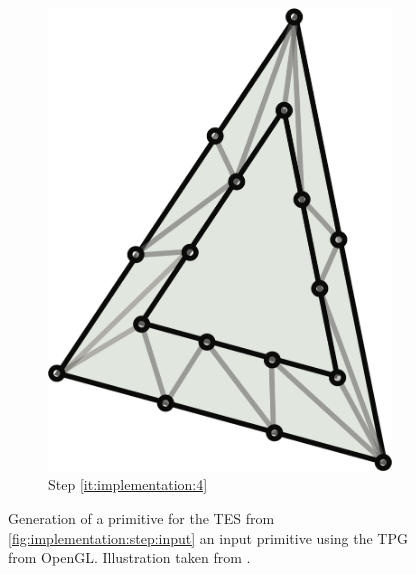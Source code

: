 \begin{figure}
\begin{subfigure}[b]{0.18\columnwidth}
		\includegraphics[width=\textwidth]{content/img/implementation/tessellation_4.png}
		\caption{Step \ref{it:implementation:4}}
		\label{fig:implementation:step:4}
	\end{subfigure}		
	\caption{Generation of a primitive for the TES  from  \ref{fig:implementation:step:input} an input primitive using the TPG from OpenGL. Illustration taken from \cite{cozzi2012opengl}.}
	\label{fig:implementation:step}
\end{figure}

